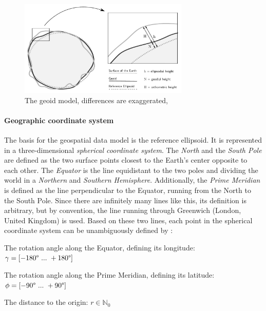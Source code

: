 \begin{figure}[H]
  \centering
  \includegraphics[width=0.72\textwidth]{graphics/basics/geoid}
  \caption{The geoid model, differences are exaggerated, \cite[Fig. 3-6, p. 75]{bolstad2008gis}}
  \label{fig:geoid}
\end{figure}


\paragraph{Geographic coordinate system} %
\label{ssub:geographic_coordinate_system}

The basis for the geospatial data model is the reference ellipsoid. It is represented in a three-dimensional \emph{spherical coordinate system}. The \emph{North} and the \emph{South Pole} are defined as the two surface points closest to the Earth's center opposite to each other. The \emph{Equator} is the line equidistant to the two poles and dividing the world in a \emph{Northern} and \emph{Southern Hemisphere}. Additionally, the \emph{Prime Meridian} is defined as the line perpendicular to the Equator, running from the North to the South Pole. Since there are infinitely many lines like this, its definition is arbitrary, but by convention, the line running through Greenwich (London, United Kingdom) is used. Based on these two lines, each point in the spherical coordinate system can be unambiguously defined by
\cite[pp. 26-28]{bolstad2008gis}:

\begin{compactenum}
  \item The rotation angle along the Equator, defining its longitude: $\gamma = [-180\degree ~...~ +180\degree]$
  \item The rotation angle along the Prime Meridian, defining its latitude: $\phi = [-90\degree ~...~ +90\degree]$
  \item The distance to the origin: $r \in \mathbb{N}_0$
\end{compactenum}

